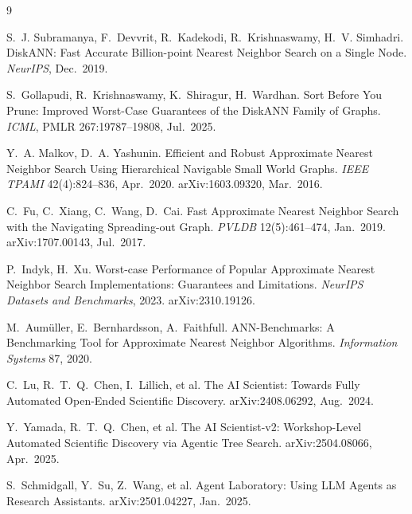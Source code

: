 \documentclass[11pt]{article}
\begin{document}
\begin{thebibliography}{9}

S.~J. Subramanya, F.~Devvrit, R.~Kadekodi, R.~Krishnaswamy, H.~V. Simhadri.
\newblock DiskANN: Fast Accurate Billion-point Nearest Neighbor Search on a
Single Node.
\newblock \emph{NeurIPS}, Dec.\ 2019.

S.~Gollapudi, R.~Krishnaswamy, K.~Shiragur, H.~Wardhan.
\newblock Sort Before You Prune: Improved Worst-Case Guarantees of the
DiskANN Family of Graphs.
\newblock \emph{ICML}, PMLR 267:19787--19808, Jul.\ 2025.

Y.~A. Malkov, D.~A. Yashunin.
\newblock Efficient and Robust Approximate Nearest Neighbor Search Using
Hierarchical Navigable Small World Graphs.
\newblock \emph{IEEE TPAMI} 42(4):824--836, Apr.\ 2020. arXiv:1603.09320,
Mar.\ 2016.

C.~Fu, C.~Xiang, C.~Wang, D.~Cai.
\newblock Fast Approximate Nearest Neighbor Search with the Navigating
Spreading-out Graph.
\newblock \emph{PVLDB} 12(5):461--474, Jan.\ 2019. arXiv:1707.00143, Jul.\ 2017.

P.~Indyk, H.~Xu.
\newblock Worst-case Performance of Popular Approximate Nearest Neighbor
Search Implementations: Guarantees and Limitations.
\newblock \emph{NeurIPS Datasets and Benchmarks}, 2023. arXiv:2310.19126.

M.~Aum\"uller, E.~Bernhardsson, A.~Faithfull.
\newblock ANN-Benchmarks: A Benchmarking Tool for Approximate Nearest
Neighbor Algorithms.
\newblock \emph{Information Systems} 87, 2020.

C.~Lu, R.~T.~Q.~Chen, I.~Lillich, et al.
\newblock The AI Scientist: Towards Fully Automated Open-Ended Scientific
Discovery.
\newblock arXiv:2408.06292, Aug.\ 2024.

Y.~Yamada, R.~T.~Q.~Chen, et al.
\newblock The AI Scientist-v2: Workshop-Level Automated Scientific Discovery
via Agentic Tree Search.
\newblock arXiv:2504.08066, Apr.\ 2025.

S.~Schmidgall, Y.~Su, Z.~Wang, et al.
\newblock Agent Laboratory: Using LLM Agents as Research Assistants.
\newblock arXiv:2501.04227, Jan.\ 2025.

\end{thebibliography}
\end{document}
